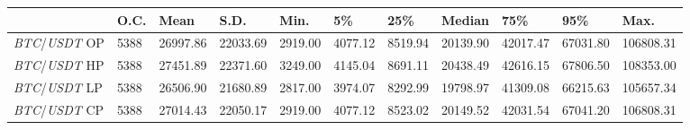 \begin{tabular}{lllllllllll}
\toprule
 & \textbf{O.C.} & \textbf{Mean} & \textbf{S.D.} & \textbf{Min.} & \textbf{5\%} & \textbf{25\%} & \textbf{Median} & \textbf{75\%} & \textbf{95\%} & \textbf{Max.} \\
\midrule
\emph{BTC}/\emph{USDT} OP & 5388 & 26997.86 & 22033.69 & 2919.00 & 4077.12 & 8519.94 & 20139.90 & 42017.47 & 67031.80 & 106808.31 \\
\emph{BTC}/\emph{USDT} HP & 5388 & 27451.89 & 22371.60 & 3249.00 & 4145.04 & 8691.11 & 20438.49 & 42616.15 & 67806.50 & 108353.00 \\
\emph{BTC}/\emph{USDT} LP & 5388 & 26506.90 & 21680.89 & 2817.00 & 3974.07 & 8292.99 & 19798.97 & 41309.08 & 66215.63 & 105657.34 \\
\emph{BTC}/\emph{USDT} CP & 5388 & 27014.43 & 22050.17 & 2919.00 & 4077.12 & 8523.02 & 20149.52 & 42031.54 & 67041.20 & 106808.31 \\
\bottomrule
\end{tabular}
